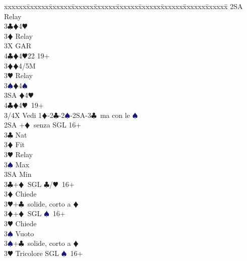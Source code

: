 \documentclass[a4paper,italian]{article}
\newcommand{\BC}{\textcolor{OliveGreen}{$\clubsuit$}}
\newcommand{\BD}{\textcolor{RedOrange}{$\vardiamondsuit$}}
\newcommand{\BH}{\textcolor{Red2}{$\varheartsuit${}}}
\newcommand{\BS}{\textcolor{MidnightBlue}{$\spadesuit${}}}
\newenvironment{bidtable}
{\begin{tabbing}

    xxxxxx\=xxxxxx\=xxxxxx\=xxxxxx\=xxxxxx\=xxxxxx\=xxxxxx\=xxxxxx\=xxxxxx\=xxxxxx\=\kill}
{\end{tabbing} }%
\begin{document}
\begin{bidtable}
                                        2SA \> Relay\+\\
                                        3\BC {}\BD 4\BH \+\\
                                        3\BD \> Relay\+\\
                                        3X \> GAR\\
                                        4\BC {}\BD 4\BH 22 19+\-\-\\
                                        3\BD {}\BD 4/5M\+\\
                                        3\BH \> Relay\+\\
                                        3\BS {}\BD 4\BS \\
                                        3SA \BD 4\BH \\
                                        4\BC {}\BD 4\BH\ 19+\-\-\\
                                        3/4X \> Vedi 1\BD -2\BC -2\BS -2SA-3\BC\ ma con le \BS \-\-\\
                                        2SA +\BD\ senza SGL 16+\+\\
                                        3\BC \> Nat\\
                                        3\BD \> Fit\\
                                        3\BH \> Relay\+\\
                                        3\BS \> Max\\
                                        3SA \> Min\-\-\\
                                        3\BC {}+\BD\ SGL \BC /\BH\ 16+\+\\
                                        3\BD \> Chiede\\
                                        3\BH {}+\BC\ solide, corto a \BD \-\\
                                        3\BD {}+\BD\ SGL \BS\ 16+\+\\
                                        3\BH \> Chiede\+\\
                                        3\BS \> Vuoto\-\\
                                        3\BS {}+\BC\ solide, corto a \BD \-\\
                                        3\BH \> Tricolore SGL \BS\ 16+\+\\

\end{bidtable}
\end{document}
